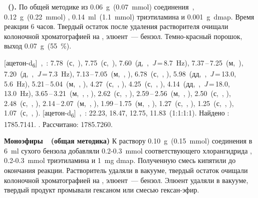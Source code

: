 \textbf{~().}
По общей методике из \SI{0.06}{\gram}~(\SI{0.07}{\milli\mole}) соединения~, \SI{0.12}{\gram}~(\SI{0.22}{\milli\mole}) , \SI{0.14}{\milli\litre}~(\SI{1.1}{\milli\mole}) триэтиламина и \SI{0.001}{\gram}~\ac{dmap}.
Время реакции 6 часов. Твердый остаток после удаления растворителя очищали колоночной хроматографией на , элюент~--- бензол.
Темно-красный порошок, выход \SI{0.07}{\gram}~(\SI{55}{\percent}). 
\begin{experimental}
    [ацетон-d\textsubscript{6}]~\chemdelta,~\si{\ppm}: 7.78~(с,~), 7.75~(с,~), 7.60~(д,~,~\textit{J}\,=\,8.7~\si{\hertz}), 7.37\,--\,7.25~(м,~), 7.20~(д,~,~\textit{J}\,=\,7.3~\si{\hertz}), 7.13\,--\,7.05~(м,~, ), 6.78~(с,~, ), 5.98~(дд,~,~\textit{J}\,=\,13.0, 5.6~\si{\hertz}), 5.21\,--\,5.04~(м,~, ), 4.27~(с,~, ), 4.25~(с,~, ), 4.14~(дд,~,~\textit{J}\,=\,18.0, 13.0~\si{\hertz}), 3.65\,--\,3.21~(м,~, , ), 2.62~(с,~, ), 2.59\,--\,2.56~(м,~, ), 2.50~(с,~, ), 2.48~(с,~, ), 2.14\,--\,2.07~(м,~, ), 1.99\,--\,1.75~(м,~, ), 1.27~(с,~, ), 1.25~(с,~, ), 1.07~(с,~, ).
    [ацетон-d\textsubscript{6}]~\chemdelta,~\si{\ppm}: 22.23, 18.47, 12.75, 11.83~(1:1:1:1).
     Найдено \ce{[M + H]+}: \num{1785.7141}. . Рассчитано: \ce{[M + H]} \num{1785.7260}.
\end{experimental}

\textbf{Моноэфиры~~(общая методика)}
К раствору \SI{0.10}{\gram}~(\SI{0.15}{\milli\mole}) соединения  в \SI{6}{\milli\litre} сухого бензола добавляли 0.2-0.3~\si{\milli\mole} соответствующего хлорангидрида , 0.2-0.3~\si{\milli\mole} триэтиламина и \SI{1}{\milli\gram} \ac{dmap}.
Полученную смесь кипятили до окончания реакции.
Растворитель удаляли в вакууме, твердый остаток очищали колоночной хроматографией на , элюент~--- бензол.
Элюент удаляли в вакууме, твердый продукт промывали гексаном или смесью гексан-эфир.

